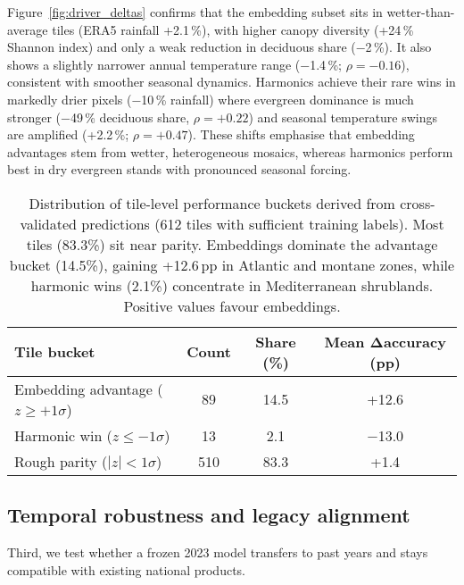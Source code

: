 \documentclass[utf8]{FrontiersinHarvard}
\begin{document}
Figure~\ref{fig:driver_deltas} confirms that the embedding subset sits in wetter-than-average tiles (ERA5 rainfall +2.1\,\%), with higher canopy diversity (+24\,\% Shannon index) and only a weak reduction in deciduous share (−2\,\%). It also shows a slightly narrower annual temperature range (−1.4\,\%; \(\rho = -0.16\)), consistent with smoother seasonal dynamics. Harmonics achieve their rare wins in markedly drier pixels (−10\,\% rainfall) where evergreen dominance is much stronger (−49\,\% deciduous share, \(\rho = +0.22\)) and seasonal temperature swings are amplified (+2.2\,\%; \(\rho = +0.47\)). These shifts emphasise that embedding advantages stem from wetter, heterogeneous mosaics, whereas harmonics perform best in dry evergreen stands with pronounced seasonal forcing.

\begin{table}[H]
    \centering
    \small
    \begin{tabular}{lccc}
        \toprule
        \textbf{Tile bucket} & \textbf{Count} & \textbf{Share (\%)} & \textbf{Mean Δaccuracy (pp)} \\
        \midrule
        Embedding advantage (\(z \ge +1\sigma\)) & 89 & 14.5 & +12.6 \\
        Harmonic win (\(z \le -1\sigma\)) & 13 & 2.1 & −13.0 \\
        Rough parity (\(|z| < 1\sigma\)) & 510 & 83.3 & +1.4 \\
        \bottomrule
    \end{tabular}
    \caption{Distribution of tile-level performance buckets derived from cross-validated predictions (612 tiles with sufficient training labels). Most tiles (83.3\%) sit near parity. Embeddings dominate the advantage bucket (14.5\%), gaining +12.6\,pp in Atlantic and montane zones, while harmonic wins (2.1\%) concentrate in Mediterranean shrublands. Positive values favour embeddings.}
    \label{tab:tile_buckets}
\end{table}

\subsection{Temporal robustness and legacy alignment}
Third, we test whether a frozen 2023 model transfers to past years and stays compatible with existing national products.
\end{document}
